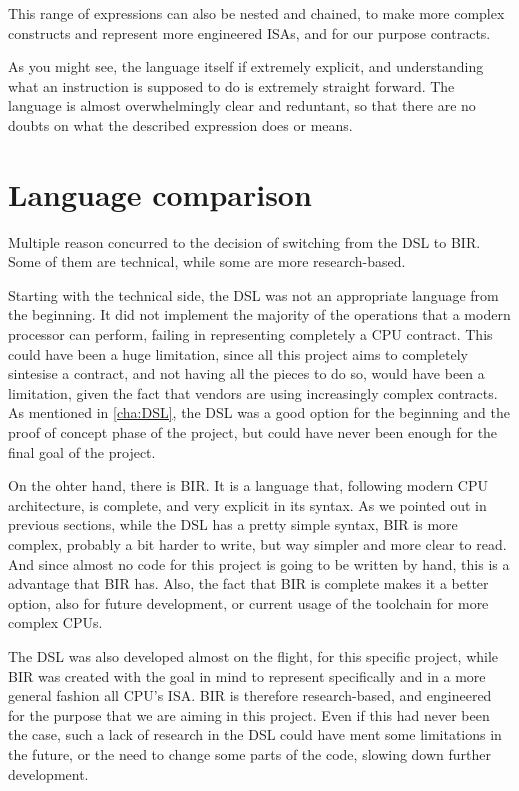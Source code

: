 This range of expressions can also be nested and chained, to make more complex
constructs and represent more engineered ISAs, and for our purpose contracts.

As you might see, the language itself if extremely explicit, and understanding what
an instruction is supposed to do is extremely straight forward. The language is
almost overwhelmingly clear and reduntant, so that there are no doubts on what the
described expression does or means.

\section{Language comparison}
\label{cha:Language comparison} Multiple reason concurred to the decision of switching
from the DSL to BIR. Some of them are technical, while some are more research-based.

Starting with the technical side, the DSL was not an appropriate language from
the beginning. It did not implement the majority of the operations that a modern
processor can perform, failing in representing completely a CPU contract. This could
have been a huge limitation, since all this project aims to completely sintesise
a contract, and not having all the pieces to do so, would have been a limitation,
given the fact that vendors are using increasingly complex contracts. As
mentioned in \ref{cha:DSL}, the DSL was a good option for the beginning and the proof
of concept phase of the project, but could have never been enough for the final
goal of the project.

On the ohter hand, there is BIR. It is a language that, following modern CPU architecture,
is complete, and very explicit in its syntax. As we pointed out in previous
sections, while the DSL has a pretty simple syntax, BIR is more complex, probably
a bit harder to write, but way simpler and more clear to read. And since almost no
code for this project is going to be written by hand, this is a advantage that
BIR has. Also, the fact that BIR is complete makes it a better option, also for future
development, or current usage of the toolchain for more complex CPUs.

The DSL was also developed almost on the flight, for this specific project,
while BIR was created with the goal in mind to represent specifically and in a
more general fashion all CPU's ISA. BIR is therefore research-based, and
engineered for the purpose that we are aiming in this project. Even if this had never
been the case, such a lack of research in the DSL could have ment some
limitations in the future, or the need to change some parts of the code, slowing
down further development.

